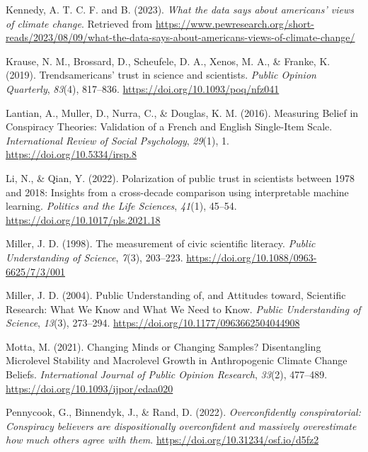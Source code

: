 \documentclass[
  doc,floatsintext]{apa6}
\newlength{\cslhangindent}
\newenvironment{CSLReferences}[2] %
 {\begin{list}{}{%
  \setlength{\itemindent}{0pt}
  \setlength{\leftmargin}{0pt}
  \setlength{\parsep}{0pt}
  \ifodd #1
   \setlength{\leftmargin}{\cslhangindent}
   \setlength{\itemindent}{-1\cslhangindent}
  \fi
  \setlength{\itemsep}{#2\baselineskip}}}
 {\end{list}}
\begin{document}
\begin{CSLReferences}{1}{0}
Kennedy, A. T. C. F. and B. (2023). \emph{What the data says about americans{'} views of climate change}. Retrieved from \url{https://www.pewresearch.org/short-reads/2023/08/09/what-the-data-says-about-americans-views-of-climate-change/}

Krause, N. M., Brossard, D., Scheufele, D. A., Xenos, M. A., \& Franke, K. (2019). Trends{\textemdash}americans{'} trust in science and scientists. \emph{Public Opinion Quarterly}, \emph{83}(4), 817--836. \url{https://doi.org/10.1093/poq/nfz041}

Lantian, A., Muller, D., Nurra, C., \& Douglas, K. M. (2016). Measuring Belief in Conspiracy Theories: Validation of a French and English Single-Item Scale. \emph{International Review of Social Psychology}, \emph{29}(1), 1. \url{https://doi.org/10.5334/irsp.8}

Li, N., \& Qian, Y. (2022). Polarization of public trust in scientists between 1978 and 2018: Insights from a cross-decade comparison using interpretable machine learning. \emph{Politics and the Life Sciences}, \emph{41}(1), 45--54. \url{https://doi.org/10.1017/pls.2021.18}

Miller, J. D. (1998). The measurement of civic scientific literacy. \emph{Public Understanding of Science}, \emph{7}(3), 203--223. \url{https://doi.org/10.1088/0963-6625/7/3/001}

Miller, J. D. (2004). Public Understanding of, and Attitudes toward, Scientific Research: What We Know and What We Need to Know. \emph{Public Understanding of Science}, \emph{13}(3), 273--294. \url{https://doi.org/10.1177/0963662504044908}

Motta, M. (2021). Changing Minds or Changing Samples? Disentangling Microlevel Stability and Macrolevel Growth in Anthropogenic Climate Change Beliefs. \emph{International Journal of Public Opinion Research}, \emph{33}(2), 477--489. \url{https://doi.org/10.1093/ijpor/edaa020}

Pennycook, G., Binnendyk, J., \& Rand, D. (2022). \emph{Overconfidently conspiratorial: Conspiracy believers are dispositionally overconfident and massively overestimate how much others agree with them}. \url{https://doi.org/10.31234/osf.io/d5fz2}


\end{CSLReferences}
\end{document}
